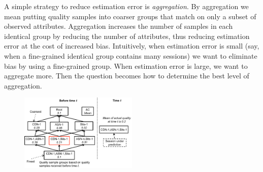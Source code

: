 

\label{subsec:aggregation}
A simple strategy to reduce estimation error is {\it aggregation}.  By aggregation we mean putting quality samples into coarser groups that match on only a subset of observed attributes.  Aggregation increases the number of samples in each identical group by reducing the number of attributes, thus reducing estimation error at the cost of increased bias. 
Intuitively, when estimation error is small (say, when a fine-grained identical group contains many sessions) we want to eliminate bias by using a fine-grained group.  When estimation error is large, we want to aggregate more. 
Then the question becomes how to determine the best level of aggregation.


\begin{figure}[h!]
\centering
 \includegraphics[width=0.5\textwidth] {figures/fig-optimal-AC.pdf}
\label{fig:example-optimal-ac}
\end{figure}

